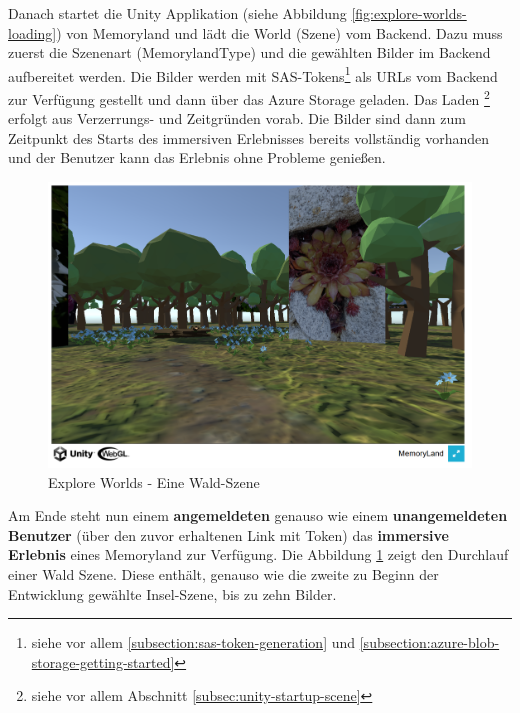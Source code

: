 Danach startet die Unity Applikation (siehe Abbildung 
\ref{fig:explore-worlds-loading}) von Memoryland und lädt die World (Szene) vom Backend. Dazu muss zuerst die Szenenart (MemorylandType) und die gewählten Bilder im Backend aufbereitet werden. Die Bilder werden mit SAS-Tokens\footnote{siehe vor allem \ref{subsection:sas-token-generation} und \ref{subsection:azure-blob-storage-getting-started}} als URLs vom Backend zur Verfügung gestellt und dann über das Azure Storage geladen. Das Laden \footnote{siehe vor allem Abschnitt \ref{subsec:unity-startup-scene}} erfolgt aus Verzerrungs- und Zeitgründen vorab. Die Bilder sind dann zum Zeitpunkt des Starts des immersiven Erlebnisses bereits vollständig vorhanden und der Benutzer kann das Erlebnis ohne Probleme genie\ss{}en. 


\begin{figure} [h t]
    \centering
    \includegraphics[scale=0.5]{pics/explore_worlds_forest.PNG}
    \caption{Explore Worlds - Eine Wald-Szene}
    \label{fig:explore-worlds-forest}
\end{figure}

Am Ende steht nun einem \textbf{angemeldeten} genauso wie einem \textbf{unangemeldeten Benutzer} (über den zuvor erhaltenen Link mit Token) das \textbf{immersive Erlebnis} eines Memoryland zur Verfügung. Die Abbildung \ref{fig:explore-worlds-forest} zeigt den Durchlauf einer Wald Szene. Diese enthält, genauso wie die zweite zu Beginn der Entwicklung gewählte Insel-Szene, bis zu zehn Bilder. 

